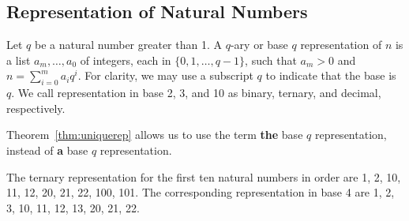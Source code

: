 \documentclass[../main.tex]{subfiles}
\begin{document}
\subsection{Representation of Natural Numbers}
\begin{defn}
    Let $q$ be a natural number greater than 1.
    A \textsf{$q$-ary} or \textsf{base $q$ representation} of $n$ is a list $a_m, \dots, a_0$ of integers, each in $\{0, 1, \dots, q-1\}$, such that $a_m > 0$ and $n = \sum_{i = 0}^m a_i q^i$.
    For clarity, we may use a subscript $q$ to indicate that the base is $q$.
    We call representation in base 2, 3, and 10 as \textsf{binary}, \textsf{ternary}, and \textsf{decimal}, respectively.

    Theorem~\ref{thm:uniquerep} allows us to use the term \textbf{the} base $q$ representation, instead of \textbf{a} base $q$ representation.
\end{defn}

\begin{ex}
    The ternary representation for the first ten natural numbers in order are 1, 2, 10, 11, 12, 20, 21, 22, 100, 101.
    The corresponding representation in base 4 are 1, 2, 3, 10, 11, 12, 13, 20, 21, 22.
\end{ex}
\end{document}
